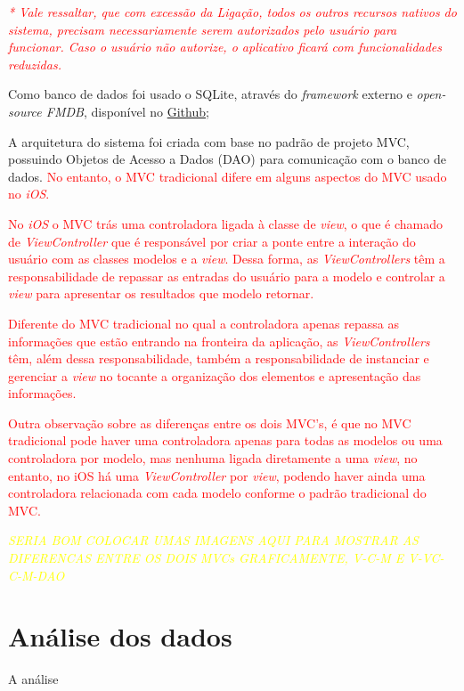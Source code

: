 \textcolor{red}{\textit{* Vale ressaltar, que com excessão da Ligação, todos os outros recursos nativos do sistema, precisam necessariamente serem autorizados pelo
usuário para funcionar. Caso o usuário não autorize, o aplicativo ficará com funcionalidades reduzidas.}} 


Como banco de dados foi usado o SQLite, através do \textit{framework} externo e \textit{open-source FMDB}, 
disponível no \href{https://github.com/ccgus/fmdb}{Github};

A arquitetura do sistema foi criada com base no padrão de projeto MVC, possuindo Objetos de Acesso a Dados (DAO) para comunicação 
com o banco de dados. \textcolor{red}{No entanto, o MVC tradicional difere em alguns aspectos do MVC usado no \textit{iOS}.} 

\textcolor{red}{No \textit{iOS} o MVC trás uma controladora ligada à classe de \textit{view}, o que é chamado de \textit{ViewController} que é responsável por 
criar a ponte entre a interação do usuário com as classes modelos e a \textit{view}. Dessa forma, as \textit{ViewControllers} têm a 
responsabilidade de repassar as entradas do usuário para a modelo e controlar a \textit{view} para apresentar os resultados que modelo retornar.}


\textcolor{red}{Diferente do MVC tradicional no qual a controladora apenas repassa as informações que estão entrando na fronteira da aplicação, 
as \textit{ViewControllers} têm, além dessa responsabilidade, também a responsabilidade de instanciar e gerenciar a \textit{view} no tocante
a organização dos elementos e apresentação das informações.}


\textcolor{red}{Outra observação sobre as diferenças entre os dois MVC's, é que no MVC tradicional pode haver uma controladora apenas 
para todas as modelos ou uma controladora por modelo, mas nenhuma ligada diretamente a uma \textit{view}, no entanto, no iOS há uma 
\textit{ViewController} por \textit{view}, podendo haver ainda uma controladora relacionada com cada modelo conforme o padrão tradicional do MVC.}

\textcolor{yellow}{\textit{SERIA BOM COLOCAR UMAS IMAGENS AQUI PARA MOSTRAR AS DIFERENCAS ENTRE OS DOIS MVCs GRAFICAMENTE, V-C-M E V-VC-C-M-DAO}}

\section{Análise dos dados} \label{sec:analise}

A análise